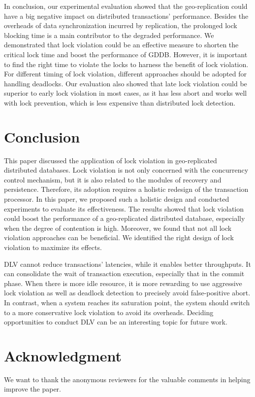 \documentclass[conference]{IEEEtran}
\begin{document}
In conclusion, our experimental evaluation showed that the geo-replication could have a big negative impact on distributed transactions' performance.
Besides the overheads of data synchronization incurred by replication, the prolonged lock blocking time is a main contributor to the degraded performance.
We demonstrated that lock violation could be an effective measure to shorten the critical lock time and boost the performance of GDDB.
However, it is important to find the right time to violate the locks to harness the benefit of lock violation.
For different timing of lock violation, different approaches should be adopted for handling deadlocks.
Our evaluation also showed that late lock violation could be superior to early lock violation in most cases, as it has less abort and works well with lock prevention, which is less expensive than distributed lock detection.


\section{Conclusion}
\label{sec:conclusion}

This paper discussed the application of lock violation in geo-replicated distributed databases.
Lock violation is not only concerned with the concurrency control mechanism, but it is also related to the modules of recovery and persistence.
Therefore, its adoption requires a holistic redesign of the transaction processor.
In this paper, we proposed such a holistic design and conducted experiments to evaluate its effectiveness.
The results showed that lock violation could boost the performance of a geo-replicated distributed database, especially when the degree of contention is high.
Moreover, we found that not all lock violation approaches can be beneficial. We identified the right design of lock violation to maximize its effects.


DLV cannot reduce transactions' latencies, while it enables better throughputs.
It can consolidate the wait of transaction execution, especially that in the commit phase.
When there is more idle resource, it is more rewarding to use aggressive lock violation as well as deadlock detection to precisely avoid false-positive abort.
In contrast, when a system reaches its saturation point, the system should switch to a more conservative
lock violation to avoid its overheads.
Deciding opportunities to conduct DLV can be an interesting topic for future work.


\section*{Acknowledgment}
We want to thank the anonymous reviewers for the valuable comments in helping improve the paper.




\end{document}

